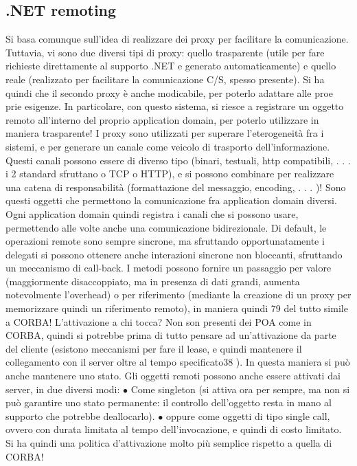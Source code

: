 \subsection{.NET remoting}
Si basa comunque sull'idea di realizzare dei proxy per facilitare la comunicazione.
Tuttavia, vi sono due diversi tipi di proxy: quello trasparente (utile per fare
richieste direttamente al supporto .NET e generato automaticamente) e quello
reale (realizzato per facilitare la comunicazione C/S, spesso presente). Si ha
quindi che il secondo proxy è anche modicabile, per poterlo adattare alle proe
prie esigenze. In particolare, con questo sistema, si riesce a registrare un oggetto remoto all'interno del proprio
application domain, per poterlo utilizzare in
maniera trasparente!
I proxy sono utilizzati per superare l'eterogeneità fra i sistemi, e per generare
un canale come veicolo di trasporto dell'informazione. Questi canali possono essere di diverso tipo (binari, testuali,
http compatibili, . . . i 2 standard sfruttano
o TCP o HTTP), e si possono combinare per realizzare una catena di responsabilità (formattazione del messaggio,
encoding, . . . )! Sono questi oggetti che
permettono la comunicazione fra application domain diversi. Ogni application
domain quindi registra i canali che si possono usare, permettendo alle volte anche una comunicazione bidirezionale.
Di default, le operazioni remote sono sempre sincrone, ma sfruttando opportunatamente i delegati si possono ottenere
anche interazioni sincrone non
bloccanti, sfruttando un meccanismo di call-back. I metodi possono fornire un
passaggio per valore (maggiormente disaccoppiato, ma in presenza di dati grandi, aumenta notevolmente l'overhead) o per
riferimento (mediante la creazione
di un proxy per memorizzare quindi un riferimento remoto), in maniera quindi
79
del tutto simile a CORBA!
L'attivazione a chi tocca? Non son presenti dei POA come in CORBA,
quindi si potrebbe prima di tutto pensare ad un'attivazione da parte del cliente
(esistono meccanismi per fare il lease, e quindi mantenere il collegamento con il
server oltre al tempo specificato38 ). In questa maniera si può anche mantenere
uno stato.
Gli oggetti remoti possono anche essere attivati dai server, in due diversi
modi:
$\bullet$ Come singleton (si attiva ora per sempre, ma non si può garantire uno
stato permanente: il controllo dell'oggetto resta in mano al supporto che
potrebbe deallocarlo).
$\bullet$ oppure come oggetti di tipo single call, ovvero con durata limitata al tempo
dell'invocazione, e quindi di costo limitato.
Si ha quindi una politica d'attivazione molto più semplice rispetto a quella di
CORBA!